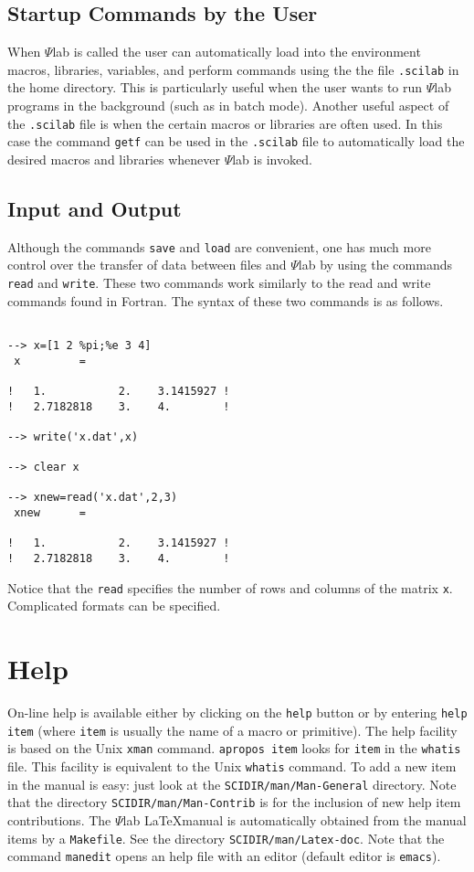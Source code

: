 \subsection{Startup Commands by the User}
\label{s5.2}

	When $\Psi$lab is called the user can automatically load
into the environment macros, libraries, variables, and perform
commands using the the file {\tt .scilab} in the home directory.  
This is particularly useful when the user wants to run $\Psi$lab programs
in the background (such as in batch mode).  Another useful aspect
of the {\tt .scilab} file is when the certain macros or libraries
are often used.  In this case the command {\tt getf} can be used
in the {\tt .scilab} file to automatically load the desired 
macros and libraries whenever $\Psi$lab is invoked.

\subsection{Input and Output}
\label{s5.3}

	Although the commands {\tt save} and {\tt load} are
convenient, one has much more control over the transfer of
data between files and $\Psi$lab by using the commands 
{\tt read}
and {\tt write}.  
These two commands work similarly to the
read and write commands found in Fortran.  The syntax of these
two commands is as follows.  
\begin{verbatim}
 
--> x=[1 2 %pi;%e 3 4]
 x         =
 
!   1.           2.    3.1415927 !
!   2.7182818    3.    4.        !
 
--> write('x.dat',x)
 
--> clear x
 
--> xnew=read('x.dat',2,3)
 xnew      =
 
!   1.           2.    3.1415927 !
!   2.7182818    3.    4.        !
\end{verbatim}
Notice that the {\tt read} specifies the number of rows and columns
of the matrix {\tt x}.
Complicated formats can be specified. 

\section{Help}
On-line help is available either by clicking on the {\tt help}
button or by entering {\tt help item} (where {\tt item} is usually the 
name of a macro or primitive). The help facility is based on the 
Unix {\tt xman} command. {\tt apropos item} looks for {\tt item} 
in the {\tt whatis} file. This facility is equivalent to the Unix 
{\tt whatis} command. To add a new item in the manual is easy: just
look at the {\tt SCIDIR/man/Man-General} directory. Note that
the directory {\tt SCIDIR/man/Man-Contrib} is for the inclusion
of new help item contributions. 
The $\Psi$lab \LaTeX  manual is automatically obtained from the
manual items by a {\tt Makefile}. 
See the directory {\tt SCIDIR/man/Latex-doc}. Note that the command
{\tt manedit} opens an help file with an editor (default editor
is {\tt emacs}).


